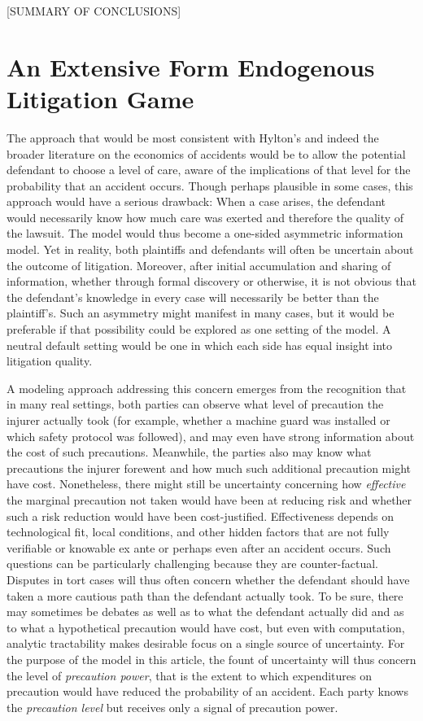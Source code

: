 \documentclass{article}
\begin{document}
[SUMMARY OF CONCLUSIONS]

\section{An Extensive Form Endogenous Litigation Game}

The approach that would be most consistent with Hylton's and indeed the broader literature on the economics of accidents would be to allow the potential defendant to choose a level of care, aware of the implications of that level for the probability that an accident occurs. Though perhaps plausible in some cases, this approach would have a serious drawback: When a case arises, the defendant would necessarily know how much care was exerted and therefore the quality of the lawsuit. The model would thus become a one-sided asymmetric information model. Yet in reality, both plaintiffs and defendants will often be uncertain about the outcome of litigation. Moreover, after initial accumulation and sharing of information, whether through formal discovery or otherwise, it is not obvious that the defendant's knowledge in every case will necessarily be better than the plaintiff's. Such an asymmetry might manifest in many cases, but it would be preferable if that possibility could be explored as one setting of the model. A neutral default setting would be one in which each side has equal insight into litigation quality. 

A modeling approach addressing this concern emerges from the recognition that in many real settings, both parties can observe what level of precaution the injurer actually took (for example, whether a machine guard was installed or which safety protocol was followed), and may even have strong information about the cost of such precautions. Meanwhile, the parties also may know what precautions the injurer forewent and how much such additional precaution might have cost. Nonetheless, there might still be uncertainty concerning how \emph{effective} the marginal precaution not taken would have been at reducing risk and whether such a risk reduction would have been cost-justified. Effectiveness depends on technological fit, local conditions, and other hidden factors that are not fully verifiable or knowable ex ante or perhaps even after an accident occurs. Such questions can be particularly challenging because they are counter-factual. Disputes in tort cases will thus often concern whether the defendant should have taken a more cautious path than the defendant actually took. To be sure, there may sometimes be debates as well as to what the defendant actually did and as to what a hypothetical precaution would have cost, but even with computation, analytic tractability makes desirable focus on a single source of uncertainty. For the purpose of the model in this article, the fount of uncertainty will thus concern the level of \emph{precaution power}, that is the extent to which expenditures on precaution would have reduced the probability of an accident. Each party knows the \emph{precaution level} but receives only a signal of precaution power. 
\end{document}
